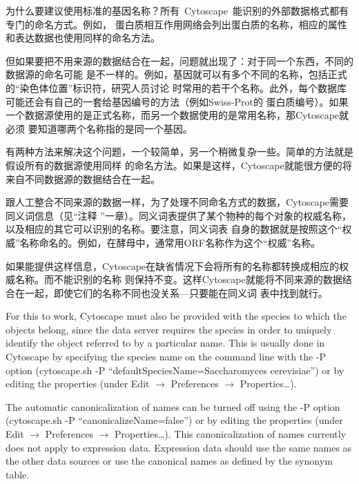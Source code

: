 为什么要建议使用标准的基因名称？所有~Cytoscape~能识别的外部数据格式都有专门的命名方式。例如，
蛋白质相互作用网络会列出蛋白质的名称，相应的属性和表达数据也使用同样的命名方法。

但如果要把不用来源的数据结合在一起，问题就出现了：对于同一个东西，不同的数据源的命名可能
是不一样的。例如，基因就可以有多个不同的名称，包括正式的``染色体位置''标识符，研究人员讨论
时常用的若干个名称。此外，每个数据库可能还会有自己的一套给基因编号的方法（例如Swiss-Prot的
蛋白质编号）。如果一个数据源使用的是正式名称，而另一个数据使用的是常用名称，那Cytoscape就必须
要知道哪两个名称指的是同一个基因。

有两种方法来解决这个问题，一个较简单，另一个稍微复杂一些。简单的方法就是假设所有的数据源使用同样
的命名方法。如果是这样，Cytoscape就能很方便的将来自不同数据源的数据结合在一起。

跟人工整合不同来源的数据一样，为了处理不同命名方式的数据，Cytoscape需要同义词信息（见``注释
''一章）。同义词表提供了某个物种的每个对象的权威名称，以及相应的其它可以识别的名称。要注意，同义词表
自身的数据就是按照这个``权威''名称命名的。例如，在酵母中，通常用ORF名称作为这个``权威''名称。

如果能提供这样信息，Cytoscape在缺省情况下会将所有的名称都转换成相应的权威名称。而不能识别的名称
则保持不变。这样Cytoscape就能将不同来源的数据结合在一起，即使它们的名称不同也没关系---只要能在同义词
表中找到就行。

For this to work, Cytoscape must also be provided with the species to which
the objects belong, since the data server requires the species in order to
uniquely identify the object referred to by a particular name. This is usually
done in Cytoscape by specifying the species name on the command line with the
-P option (cytoscape.sh -P ``defaultSpeciesName=Saccharomyces
cerevisiae'') or by editing the properties (under Edit $\rightarrow$ Preferences
$\rightarrow$ Properties\ldots). 

The automatic canonicalization of names can be turned off using the -P option
(cytoscape.sh -P ``canonicalizeName=false'') or by editing the properties (under
Edit $\rightarrow$ Preferences $\rightarrow$ Properties\ldots). This canonicalization
of names currently does not apply to expression data. Expression data should
use the same names as the other data sources or use the canonical names as
defined by the synonym table. 
